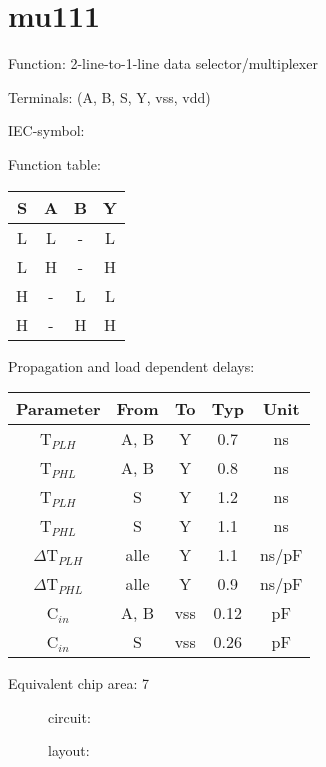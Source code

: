 
\section{mu111}

Function: 2-line-to-1-line data selector/multiplexer

Terminals: (A, B, S, Y, vss, vdd)


IEC-symbol:
\begin{figure}[bth]
\end{figure}

Function table:
\begin{table}[bth]
\begin{tabular}{|c|cc||c|}
\hline
S	&A	&B	&Y\\
\hline
L	&L	&-	&L\\
L	&H	&-	&H\\
H	&-	&L	&L\\
H	&-	&H	&H\\
\hline
\end{tabular}
\vspace{1cm}


Propagation and load dependent delays:\\

\begin{tabular}{|c|c|c|c|c|}
\hline
Parameter               &From            &To   &Typ    &Unit\\
\hline
T$_{PLH}$               &A, B     	&Y      &0.7    &ns\\
T$_{PHL}$               &A, B    	&Y      &0.8    &ns\\
T$_{PLH}$               &S         	&Y      &1.2    &ns\\
T$_{PHL}$               &S         	&Y      &1.1    &ns\\
\hline
$\Delta$T$_{PLH}$       &alle           &Y      &1.1    &ns/pF\\
$\Delta$T$_{PHL}$       &alle           &Y      &0.9    &ns/pF\\
\hline
C$_{in}$                &A, B    	&vss    &0.12   &pF\\
C$_{in}$                &S             	&vss    &0.26   &pF\\
\hline
\end{tabular}
\end{table}


Equivalent chip area: 7




\begin{figure}[bth]
circuit:\\

\end{figure}



\begin{figure}[bth]
layout:\\

\end{figure}

\clearpage
